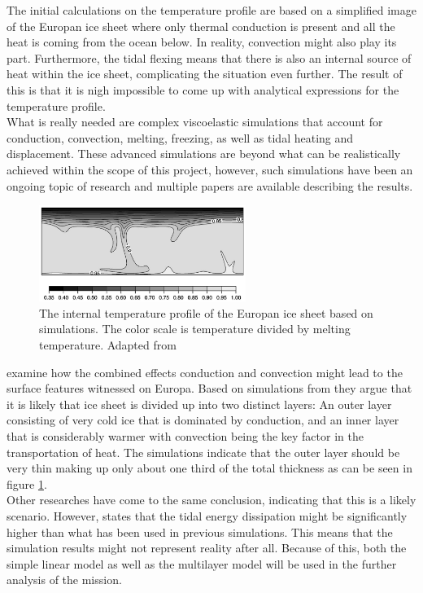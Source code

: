 \label{sec:IceTemperatureProfile2}
The initial calculations on the temperature profile are based on a simplified image of the Europan ice sheet where only thermal conduction is present and all the heat is coming from the ocean below. In reality, convection might also play its part. Furthermore, the tidal flexing means that there is also an internal source of heat within the ice sheet, complicating the situation even further. The result of this is that it is nigh impossible to come up with analytical expressions for the temperature profile.\\

\noindent
What is really needed are complex viscoelastic simulations that account for conduction, convection, melting, freezing, as well as tidal heating and displacement. These advanced simulations are beyond what can be realistically achieved within the scope of this project, however, such simulations have been an ongoing topic of research and multiple papers are available describing the results.\\

\begin{figure}[ht]
	\centering
	\includegraphics[width = 0.6\textwidth]{figures/LAMC/2layer}
	\caption{The internal temperature profile of the Europan ice sheet based on simulations. The color scale is temperature divided by melting temperature. Adapted from \cite{article:barr2014a}}
	\label{fig:2layer}
\end{figure}

\noindent 
\citet{article:barr2014a} examine how the combined effects conduction and convection might lead to the surface features witnessed on Europa. Based on simulations from \citet{article:showman2005a} they argue that it is likely that ice sheet is divided up into two distinct layers: An outer layer consisting of very cold ice that is dominated by conduction, and an inner layer that is considerably warmer with convection being the key factor in the transportation of heat. The simulations indicate that the outer layer should be very thin making up only about one third of the total thickness as can be seen in figure \ref{fig:2layer}. \\

\noindent
Other researches have come to the same conclusion, indicating that this is a likely scenario\cite{article:mckinnon1999a}\cite{article:tobie2003a}. However, \citet{article:mccarthy2016a} states that the tidal energy dissipation might be significantly higher than what has been used in previous simulations. This means that the simulation results might not represent reality after all. Because of this, both the simple linear model as well as the multilayer model will be used in the further analysis of the mission.
